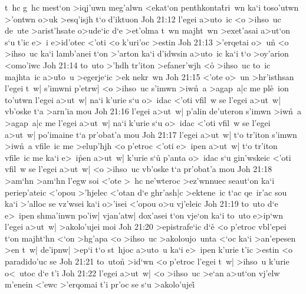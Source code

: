 t~hc
g~hc
mest`on
>iqj'uwn
meg'alwn
<ekat`on
penthkonta\r{t}ri~wn
ka`i
toso'utwn
>'ontwn
o>uk
>esq'isjh
t`o
d'iktuon\bibvsend
\vs Joh 21:12
l'egei
a>uto~ic
<o
>ihso~uc
de~ute
>arist'hsate
o>ude`ic
d`e
>et'olma
t~wn
majht~wn
>exet'asai
a>ut`on
s`u
t'ic
e>~i
e>id'otec
<'oti
<o
k'uri'oc
>estin\bibvsend
\vs Joh 21:13
>'erqetai
o>~un\r{}
<o
>ihso~uc
ka`i
lamb'anei
t`on
>'arton
ka`i
d'idwsin
a>uto~ic
ka`i
t`o
>oy'arion
<omo'iwc\bibvsend
\vs Joh 21:14
to~uto
>'hdh
tr'iton
>efaner'wjh
<o\r{}
>ihso~uc
to~ic
majhta~ic
a>u\r{t}o~u
>egerje`ic
>ek
nekr~wn\bibvsend
\vs Joh 21:15
<'ote
o>~un
>hr'isthsan
l'egei
t~w|
s'imwni
p'etrw|
<o
>ihso~uc
s'imwn
>iw\r{n}~a
>agap~a|c
me
pl\r{e}~ion
to'utwn
l'egei
a>ut~w|
na`i
k'urie
s`u
o>~idac
<'oti
vfil~w
se
l'egei
a>ut~w|
vb'oske
t`a
>arn'ia
mou\bibvsend
\vs Joh 21:16
l'egei
a>ut~w|
p'alin
de'uteron
s'imwn
>iw\r{n}~a
>agap~a|c
me
l'egei
a>ut~w|
na`i
k'urie
s`u
o>~idac
<'oti
vfil~w
se
l'egei
a>ut~w|
po'imaine
t`a
pr'obat'a
mou\bibvsend
\vs Joh 21:17
l'egei
a>ut~w|
t`o
tr'iton
s'imwn
>iw\r{n}~a
vfile~ic
me
>elup'hjh
<o
p'etroc
<'oti
e>~ipen
a>ut~w|
t`o
tr'iton
vfile~ic
me
ka`i
e>~i\r{p}en
a>ut~w|
k'urie
s`u\r{}
p'anta
o>~idac
s`u
gin'wskeic
<'oti
vfil~w
se
l'egei
a>ut~w|
<o
>ihso~uc
vb'oske
t`a
pr'obat'a
mou\bibvsend
\vs Joh 21:18
>am`hn
>am`hn
l'egw
soi
<'ote
>~hc
ne'wteroc
>ez'wnnuec
seaut`on
ka`i
periep'ateic
<'opou
>'hjelec
<'otan
d`e
ghr'ash|c
>ektene~ic
t`ac
qe~ir'ac
sou
ka`i
>'alloc
se
vz'wsei
ka`i
o>'isei
<'opou
o>u
vj'eleic\bibvsend
\vs Joh 21:19
to~uto
d`e
e>~ipen
shma'inwn
po'iw|
vjan'atw|
dox'asei
t`on
vje`on
ka`i
to~uto
e>ip`wn
l'egei
a>ut~w|
>akolo'ujei
moi\bibvsend
\vs Joh 21:20
>epistrafe`ic
d`e\r{}
<o
p'etroc
vbl'epei
t`on
majht`hn
<`on
>hg'apa
<o
>ihso~uc
>akoloujo~unta
<`oc
ka`i
>an'epesen
>en
t~w|
de'ipnw|
>ep`i
t`o
st~hjoc
a>uto~u
ka`i
e>~ipen
k'urie
t'ic
>estin
<o
paradido'uc
se\bibvsend
\vs Joh 21:21
to~uto\r{n}
>id`wn
<o
p'etroc
l'egei
t~w|
>ihso~u
k'urie
o<~utoc
d`e
t'i\bibvsend
\vs Joh 21:22
l'egei
a>ut~w|
<o
>ihso~uc
>e`an
a>ut`on
vj'elw
m'enein
<'ewc
>'erqomai
t'i
pr'oc
se
s`u
>akolo'ujei\r{}
